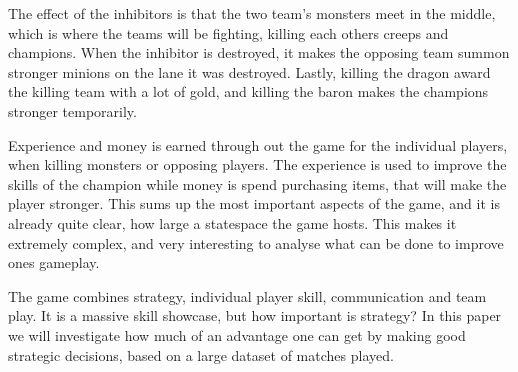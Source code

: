 The effect of the inhibitors is that the two team's monsters meet in the middle, which is where the teams will be fighting, killing each others creeps and champions. When the inhibitor is destroyed, it makes the opposing team summon stronger minions on the lane it was destroyed. Lastly, killing the dragon award the killing team with a lot of gold, and killing the baron makes the champions stronger temporarily.

Experience and money is earned through out the game for the individual players, when killing monsters or opposing players. The experience is used to improve the skills of the champion while money is spend purchasing items, that will make the player stronger. This sums up the most important aspects of the game, and it is already quite clear, how large a statespace the game hosts. This makes it extremely complex, and very interesting to analyse what can be done to improve ones gameplay. 

The game combines strategy, individual player skill, communication and team play. It is a massive skill showcase, but how important is strategy? In this paper we will investigate how much of an advantage one can get by making good strategic decisions, based on a large dataset of matches played.


